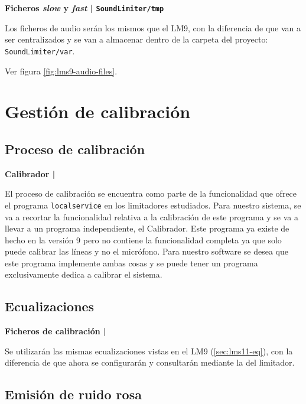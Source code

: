 \begin{flushright}
\textbf{Ficheros \textit{slow} y \textit{fast} | \texttt{SoundLimiter/tmp}}
\end{flushright}

Los ficheros de audio serán los mismos que el \acrshort{LM9}, con la diferencia de que van a ser centralizados y se van a almacenar dentro de la carpeta del proyecto: \texttt{SoundLimiter/var}.

Ver figura \ref{fig:lms9-audio-files}.

\section{Gestión de calibración}

\subsection{Proceso de calibración}

\begin{flushright}
\textbf{Calibrador | }
\end{flushright}

El proceso de calibración se encuentra como parte de la funcionalidad que ofrece el programa \texttt{localservice} en los limitadores estudiados. Para nuestro sistema, se va a recortar la funcionalidad relativa a la calibración de este programa y se va a llevar a un programa independiente, el Calibrador. Este programa ya existe de hecho en la versión 9 pero no contiene la funcionalidad completa ya que solo puede calibrar las líneas y no el micrófono. Para nuestro software se desea que este programa implemente ambas cosas y se puede tener un programa exclusivamente dedica a calibrar el sistema.

\subsection{Ecualizaciones}

\begin{flushright}
\textbf{Ficheros de calibración | }
\end{flushright}

Se utilizarán las mismas ecualizaciones vistas en el \acrshort{LM9} (\ref{sec:lms11-eq}), con la diferencia de que ahora se configurarán y consultarán mediante la  del limitador.

\subsection{Emisión de ruido rosa}

